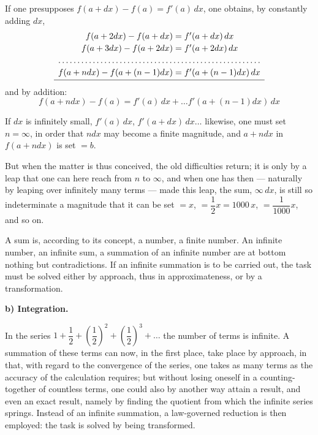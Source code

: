 \documentclass[12pt]{book}
\begin{document}
If one presupposes $f(a + dx) - f(a) = f'(a)\,dx$, one obtains, by constantly adding
$dx$,
\[
\begin{array}{r@{\;=\;}l}
f(a+2dx) - f(a+dx) & f'(a+dx)\,dx\\[2pt]
f(a+3dx) - f(a+2dx) & f'(a+2dx)\,dx\\[2pt]
\hdotsfor{2}\\[2pt]
f(a+ndx) - f(a+(n-1)dx) & f'(a+(n-1)dx)\,dx\\[2pt]
\hline
\end{array}
\]
and by addition:
\[
f(a+ndx) - f(a) = f'(a)\,dx + \dots f'(a+(n-1)dx)\,dx
\]

If $dx$ is infinitely small, $f'(a)\,dx$, $f'(a+dx)\,dx \dots$ likewise, one must set
$n = \infty$, in order that $ndx$ may become a finite magnitude, and $a + ndx$ in
$f(a + ndx)$ is set $= b$.

But when the matter is thus conceived, the old difficulties return; it is only by a
leap that one can here reach from $n$ to $\infty$, and when one has then --- naturally
by leaping over infinitely many terms --- made this leap,
the sum, $\infty\, dx$, is still so indeterminate a magnitude that it can be set
$= x$, $= \dfrac{1}{2}x = 1000\,x$, $= \dfrac{1}{1000}x$, and so on.

A sum is, according to its concept, a number, a finite number. An infinite number, an
infinite sum, a summation of an infinite number are at bottom nothing but
contradictions. If an infinite summation is to be carried out, the task must be solved
either by approach, thus in approximateness, or by a transformation.

\begin{center}
\textbf{b) Integration.}
\end{center}
{}

In the series $1 + \dfrac{1}{2} + \left(\dfrac{1}{2}\right)^{2}
+ \left(\dfrac{1}{2}\right)^{3} + \dots$ the number of terms is infinite. A summation
of these terms can now, in the first place, take place by approach, in that, with
regard to the convergence of the series, one takes as many terms as the accuracy of
the calculation requires; but without losing oneself in a counting-together of
countless terms, one could also by another way attain a result, and even an exact
result, namely by finding the quotient from which the infinite series springs.
Instead of an infinite summation, a law-governed reduction is then employed: the task
is solved by being transformed.
\end{document}
